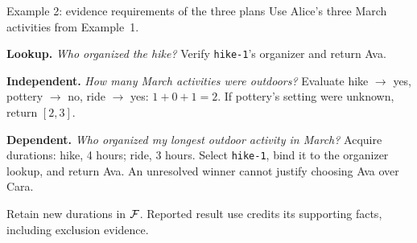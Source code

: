 \begin{memoryexample}{Example 2: evidence requirements of the three plans}
Use Alice's three March activities from Example~1.

\smallskip
\textbf{Lookup.} \emph{Who organized the hike?}
Verify \texttt{hike-1}'s organizer and return Ava.

\smallskip
\textbf{Independent.} \emph{How many March activities were outdoors?}
Evaluate hike $\to$ yes, pottery $\to$ no, ride $\to$ yes:
$1+0+1=2$. If pottery's setting were unknown, return $[2,3]$.

\smallskip
\textbf{Dependent.} \emph{Who organized my longest outdoor activity in March?}
Acquire durations: hike, 4 hours; ride, 3 hours.
Select \texttt{hike-1}, bind it to the organizer lookup, and return Ava.
An unresolved winner cannot justify choosing Ava over Cara.

\smallskip
Retain new durations in $\mathcal{F}$. Reported result use credits its
supporting facts, including exclusion evidence.
\end{memoryexample}
